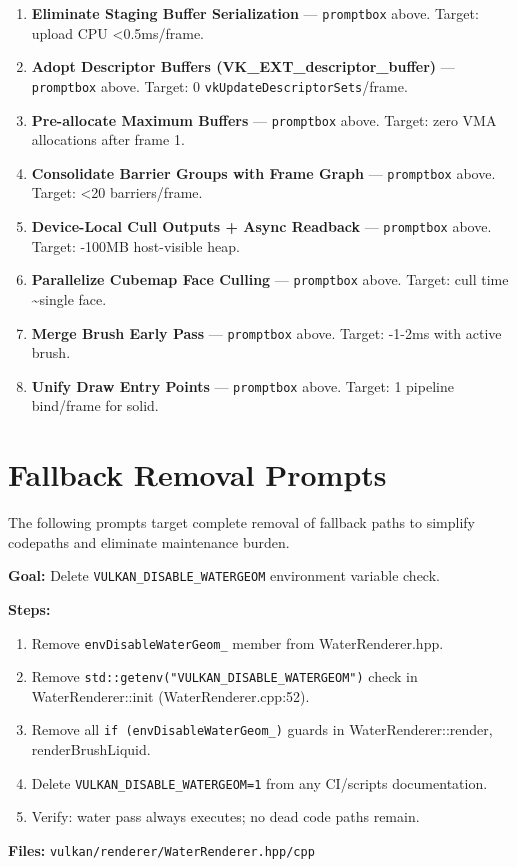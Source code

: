\documentclass[11pt,a4paper]{article}
\begin{document}
\begin{enumerate}
    \item \textbf{Eliminate Staging Buffer Serialization} — \texttt{promptbox} above. Target: upload CPU <0.5ms/frame.
    \item \textbf{Adopt Descriptor Buffers (VK\_EXT\_descriptor\_buffer)} — \texttt{promptbox} above. Target: 0 \texttt{vkUpdateDescriptorSets}/frame.
    \item \textbf{Pre-allocate Maximum Buffers} — \texttt{promptbox} above. Target: zero VMA allocations after frame 1.
    \item \textbf{Consolidate Barrier Groups with Frame Graph} — \texttt{promptbox} above. Target: <20 barriers/frame.
    \item \textbf{Device-Local Cull Outputs + Async Readback} — \texttt{promptbox} above. Target: -100MB host-visible heap.
    \item \textbf{Parallelize Cubemap Face Culling} — \texttt{promptbox} above. Target: cull time \textasciitilde single face.
    \item \textbf{Merge Brush Early Pass} — \texttt{promptbox} above. Target: -1-2ms with active brush.
    \item \textbf{Unify Draw Entry Points} — \texttt{promptbox} above. Target: 1 pipeline bind/frame for solid.
\end{enumerate}

\section{Fallback Removal Prompts}

The following prompts target complete removal of fallback paths to simplify codepaths and eliminate maintenance burden.

\begin{tcolorbox}[promptbox={Prompt: Remove Water Geometry Disable Flag}]
\textbf{Goal:} Delete \texttt{VULKAN\_DISABLE\_WATERGEOM} environment variable check.

\textbf{Steps:}
\begin{enumerate}
    \item Remove \texttt{envDisableWaterGeom\_} member from WaterRenderer.hpp.
    \item Remove \texttt{std::getenv("VULKAN\_DISABLE\_WATERGEOM")} check in WaterRenderer::init (WaterRenderer.cpp:52).
    \item Remove all \texttt{if (envDisableWaterGeom\_)} guards in WaterRenderer::render, renderBrushLiquid.
    \item Delete \texttt{VULKAN\_DISABLE\_WATERGEOM=1} from any CI/scripts documentation.
    \item Verify: water pass always executes; no dead code paths remain.
\end{enumerate}

\textbf{Files:} \texttt{vulkan/renderer/WaterRenderer.hpp/cpp}
\end{tcolorbox}
\end{document}
